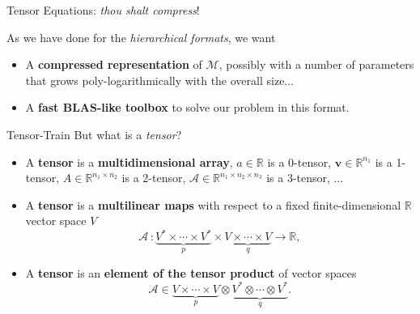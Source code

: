 \documentclass[aspectratio=169,xcolor=dvipsnames]{beamer}
\begin{document}
\begin{frame}{\faCompress\;Tensor Equations: \emph{thou shalt compress}!}

As we have done for the \emph{hierarchical formats}, we want
\begin{itemize}
	\item[\faGem] A \alert{\textbf{compressed representation}} of $\mathcal{M}$, possibly with a number of parameters that grows poly-logarithmically with the overall size$\ldots$
	\item[\faToolbox] A \alert{\textbf{fast BLAS-like toolbox}} to solve our problem in this format.
\end{itemize}
\vfill



\end{frame}

\begin{frame}{\faTrain\;Tensor-Train}
\faQuestionCircle\;But what is a \emph{tensor}?

\begin{itemize}
	\item[\faBook]<2-> A \textbf{tensor} is a \textbf{multidimensional array}, $a \in \mathbb{R}$ is a 0-tensor, $\mathbf{v} \in \mathbb{R}^{n_1}$ is a 1-tensor, $A \in \mathbb{R}^{{n_1} \times {n_2}}$ is a 2-tensor, $\mathbf{\mathcal{A}} \in \mathbb{R}^{{n}_1 \times n_{2} \times n_3}$ is a 3-tensor, $\ldots$
	\item[\faBook]<3-> A \textbf{tensor} is a \textbf{multilinear maps} with respect to a fixed finite-dimensional $\mathbb{R}$ vector space $V$
	\[
	\mathbf{\mathcal{A}} \,: \underbrace{V^* \times \cdots \times V^*}_p \times \underbrace{V \times \cdots \times V}_q \rightarrow \mathbb{R},
	\]
	\item[\faBook]<4-> A \textbf{tensor} is an \textbf{element of the tensor product} of vector spaces
	\[
	\mathbf{\mathcal{A}} \in \underbrace{V \times \cdots \times V}_p \otimes \underbrace{V^* \otimes \cdots \otimes V^*}_q.
	\]
\end{itemize}


\end{frame}
\end{document}
